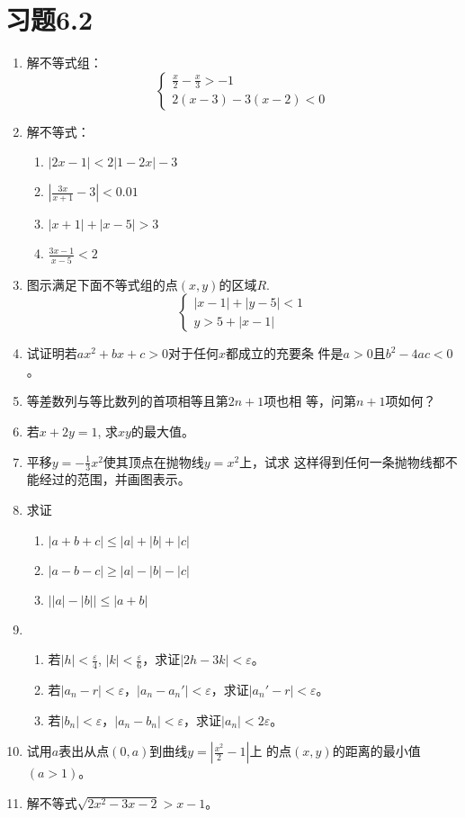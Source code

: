 \section*{习题6.2}

\begin{enumerate}
    \item 解不等式组：
\[\begin{cases}
    \frac{x}{2}-\frac{x}{3}>-1\\
    2(x-3)-3(x-2)<0
\end{cases}\]

\item 解不等式：
\begin{multicols}{2}
\begin{enumerate}
    \item $|2x-1|<2|1-2x|-3$
    \item $\left|\frac{3x}{x+1}-3\right|<0.01$
    \item $|x+1|+|x-5|>3$
    \item $\frac{3x-1}{x-5}<2$
\end{enumerate}
\end{multicols}

\item 图示满足下面不等式组的点$(x,y)$的区域$R$.
\[\begin{cases}
    |x-1|+|y-5|<1\\
y>5+|x-1|
\end{cases}\]
\item 试证明若$ax^2+bx+c>0$对于任何$x$都成立的充要条
件是$a>0$且$b^2-4ac<0$。
\item 等差数列与等比数列的首项相等且第$2n+1$项也相
等，问第$n+1$项如何？
\item 若$x+2y=1$, 求$xy$的最大值。
\item 平移$y=-\frac{1}{3}x^2$使其顶点在抛物线$y=x^2$上，试求
这样得到任何一条抛物线都不能经过的范围，并画图表示。
\item 求证
\begin{enumerate}
    \item $|a+b+c|\le |a|+|b|+|c|$
    \item $|a-b-c|\ge |a|-|b|-|c|$
    \item $\Big| |a|-|b| \Big|\le |a+b|$
\end{enumerate}

\item \begin{enumerate}
    \item 若$|h|<\frac{\varepsilon}{4}$, $|k|<\frac{\varepsilon}{6}$，求证$|2h-3k|<\varepsilon$。
    \item 若$|a_n-r|<\varepsilon$，$|a_n-a_n'|<\varepsilon$，求证$|a_n'-r|<\varepsilon$。
    \item 若$|b_n|<\varepsilon$，$|a_n-b_n|<\varepsilon$，求证$|a_n|<2\varepsilon$。
\end{enumerate}

\item 试用$a$表出从点$(0,a)$到曲线$y=\left|\frac{x^2}{2}-1\right|$上
的点$(x,y)$的距离的最小值$(a>1)$。

\item 解不等式$\sqrt{2x^2-3x-2}>x-1$。
\end{enumerate}

